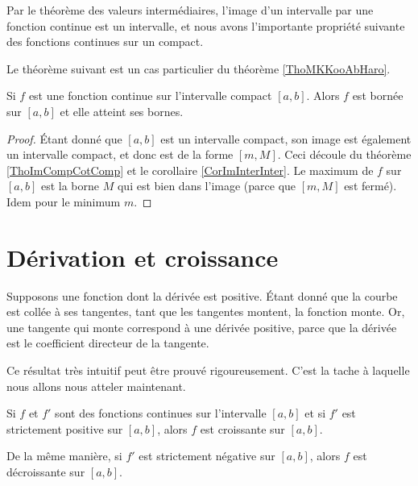 Par le théorème des valeurs intermédiaires, l'image d'un intervalle par une fonction continue est un intervalle, et nous avons l'importante propriété suivante des fonctions continues sur un compact.

Le théorème suivant est un cas particulier du théorème \ref{ThoMKKooAbHaro}.
\begin{theorem}
    Si $f$ est une fonction continue sur l'intervalle compact $[a,b]$. Alors $f$ est bornée sur $[a,b]$ et elle atteint ses bornes.
\end{theorem}

\begin{proof}
    Étant donné que $[a,b]$ est un intervalle compact, son image est également un intervalle compact, et donc est de la forme $[m,M]$. Ceci découle du théorème \ref{ThoImCompCotComp} et le corollaire \ref{CorImInterInter}. Le maximum de $f$ sur $[a,b]$ est la borne $M$ qui est bien dans l'image (parce que $[m,M]$ est fermé). Idem pour le minimum $m$.
\end{proof}

\section{Dérivation et croissance}

Supposons une fonction dont la dérivée est positive. Étant donné que la courbe est \og collée \fg{} à ses tangentes, tant que les tangentes montent, la fonction monte. Or, une tangente qui monte correspond à une dérivée positive, parce que la dérivée est le coefficient directeur de la tangente.

Ce résultat très intuitif peut être prouvé rigoureusement. C'est la tache à laquelle nous allons nous atteler maintenant.

\begin{proposition} \label{PropGFkZMwD}
    Si $f$ et $f'$ sont des fonctions continues sur l'intervalle $[a,b]$ et si $f'$ est strictement positive sur $[a,b]$, alors $f$ est croissante sur $[a,b]$.

    De la même manière, si $f'$ est strictement négative sur $[a,b]$, alors $f$ est décroissante sur $[a,b]$.
\end{proposition}

